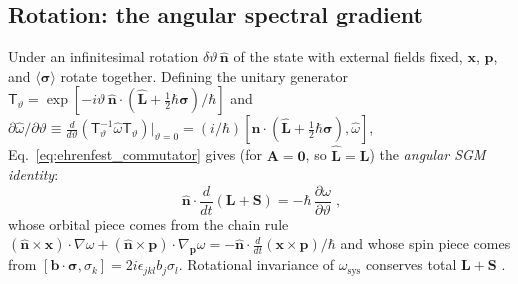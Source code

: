 \documentclass[aps,prd,onecolumn,tightenlines,nofootinbib,notitlepage,10pt,floatfix]{revtex4-2}
\theoremstyle{indentedtheorem}
\begin{document}
\subsection{Rotation: the angular spectral gradient}
\label{sec:angular}

Under an infinitesimal rotation $\delta\vartheta\,\hat{\mathbf{n}}$ of the state with external fields fixed, $\mathbf{x}$, $\mathbf{p}$, and $\langle\boldsymbol{\sigma}\rangle$ rotate together. Defining the unitary generator $\mathsf{T}_\vartheta=\exp[-i\vartheta\,\hat{\mathbf{n}}\cdot(\hat{\mathbf{L}}+\tfrac{1}{2}\hbar\boldsymbol{\sigma})/\hbar]$ and $\partial\hat{\omega}/\partial\vartheta\equiv\frac{d}{d\vartheta}(\mathsf{T}_\vartheta^{-1}\hat{\omega}\mathsf{T}_\vartheta)|_{\vartheta=0}=(i/\hbar)[\hat{\mathbf{n}}\cdot(\hat{\mathbf{L}}+\tfrac{1}{2}\hbar\boldsymbol{\sigma}),\hat{\omega}]$, Eq.~\eqref{eq:ehrenfest_commutator} gives (for $\mathbf{A}=\mathbf{0}$, so $\hat{\mathbf{L}}=\mathbf{L}$) the \emph{angular SGM identity}:
\begin{equation}
    \boxed{\;\hat{\mathbf{n}}\cdot\frac{d}{dt}(\mathbf{L}+\mathbf{S}) = -\hbar\,\frac{\partial\omega}{\partial\vartheta}\;} ,
    \label{eq:sgm_angular}
\end{equation}
whose orbital piece comes from the chain rule $(\hat{\mathbf{n}}\times\mathbf{x})\cdot\nabla\omega+(\hat{\mathbf{n}}\times\mathbf{p})\cdot\nabla_{\mathbf{p}}\omega=-\hat{\mathbf{n}}\cdot\frac{d}{dt}(\mathbf{x}\times\mathbf{p})/\hbar$ and whose spin piece comes from $[\mathbf{b}\cdot\boldsymbol{\sigma},\sigma_k]=2i\epsilon_{jkl}b_j\sigma_l$. Rotational invariance of $\omega_\text{sys}$ conserves total $\mathbf{L}+\mathbf{S}$ \citep{Noether1918Invariante}.
\end{document}
